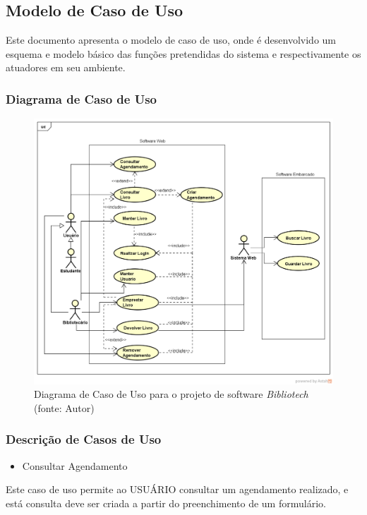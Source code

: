 \subsection[Modelo de Caso de Uso]{Modelo de Caso de Uso}
Este documento apresenta o modelo de caso de uso, onde é desenvolvido um esquema e modelo básico das funções pretendidas do sistema e respectivamente os atuadores em seu ambiente. 

\subsubsection{Diagrama de Caso de Uso}
\begin{figure}[!h]
\centering
\includegraphics[scale=0.50, angle = 360]{figuras/caso_uso}
\caption[]{Diagrama de Caso de Uso para o projeto de software \textit{Bibliotech} (fonte: Autor)
}
\end{figure}
\FloatBarrier

\subsubsection{Descrição de Casos de Uso}

\begin{itemize}
\item{Consultar Agendamento}
\end{itemize}

Este caso de uso permite ao USUÁRIO consultar um agendamento realizado, e está consulta deve ser criada a partir do preenchimento de um formulário.

